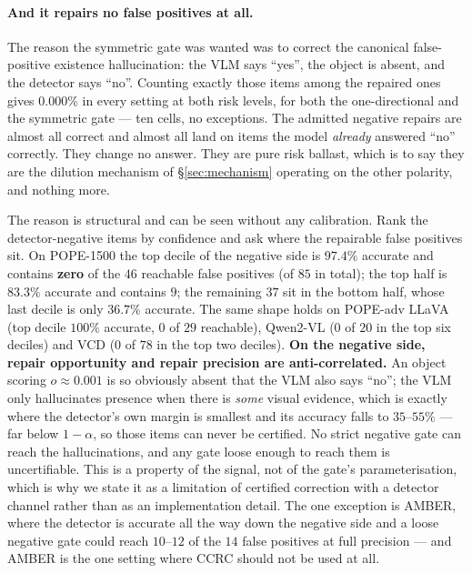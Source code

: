 \documentclass{article}
\theoremstyle{plain}
\theoremstyle{definition}
\theoremstyle{remark}
\begin{document}
\paragraph{And it repairs no false positives at all.}
The reason the symmetric gate was wanted was to correct the canonical false-positive existence
hallucination: the VLM says ``yes'', the object is absent, and the detector says ``no''. Counting
exactly those items among the repaired ones gives $0.000\%$ in every setting at both risk
levels, for both the one-directional and the symmetric gate --- ten cells, no exceptions. The
admitted negative repairs are almost all correct and almost all land on items the model
\emph{already} answered ``no'' correctly. They change no answer. They are pure risk ballast,
which is to say they are the dilution mechanism of \S\ref{sec:mechanism} operating on the other
polarity, and nothing more.

The reason is structural and can be seen without any calibration. Rank the detector-negative
items by confidence and ask where the repairable false positives sit. On POPE-1500 the top
decile of the negative side is $97.4\%$ accurate and contains \textbf{zero} of the $46$ reachable
false positives (of $85$ in total); the top half is $83.3\%$ accurate and contains $9$; the
remaining $37$ sit in the bottom half, whose last decile is only $36.7\%$ accurate. The same
shape holds on POPE-adv LLaVA (top decile
$100\%$ accurate, $0$ of $29$ reachable), Qwen2-VL ($0$ of $20$ in the top six deciles) and VCD
($0$ of $78$ in the top two deciles). \textbf{On the negative side, repair opportunity and repair
precision are anti-correlated.} An object scoring $o\approx0.001$ is so obviously absent that the
VLM also says ``no''; the VLM only hallucinates presence when there is \emph{some} visual
evidence, which is exactly where the detector's own margin is smallest and its accuracy falls to
$35$--$55\%$ --- far below $1-\alpha$, so those items can never be certified. No strict negative
gate can reach the hallucinations, and any gate loose enough to reach them is uncertifiable. This
is a property of the signal, not of the gate's parameterisation, which is why we state it as a
limitation of certified correction with a detector channel rather than as an implementation
detail. The one exception is AMBER, where the detector is accurate all the way down the negative
side and a loose negative gate could reach $10$--$12$ of the $14$ false positives at full
precision --- and AMBER is the one setting where CCRC should not be used at all.
\end{document}
